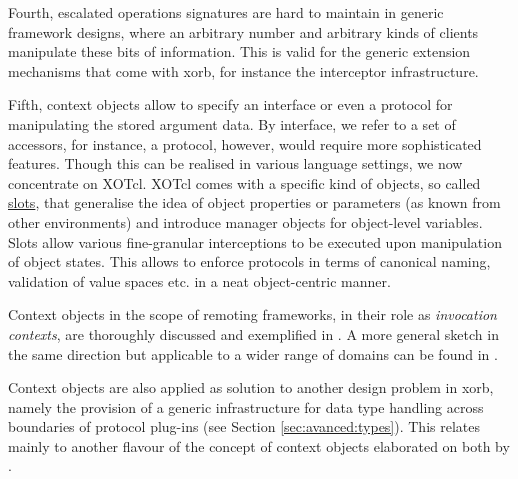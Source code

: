 Fourth, escalated operations signatures are hard to maintain in generic framework designs, where an arbitrary number and arbitrary kinds of clients manipulate these bits of information. This is valid for the generic extension mechanisms that come with xorb, for instance the interceptor infrastructure.

Fifth, context objects allow to specify an interface or even a protocol for manipulating the stored argument data. By interface, we refer to a set of accessors, for instance, a protocol, however, would require more sophisticated features. Though this can be realised in various language settings, we now concentrate on XOTcl. XOTcl comes with a specific kind of objects, so called \href{http://media.wu-wien.ac.at/doc/tutorial.html#slots}{slots}, that generalise the idea of object properties or parameters (as known from other environments) and introduce manager objects for object-level variables. Slots allow various fine-granular interceptions to be executed upon manipulation of object states. This allows to enforce protocols in terms of canonical naming, validation of value spaces etc. in a neat object-centric manner.

Context objects in the scope of remoting frameworks, in their role as \emph{invocation contexts}, are thoroughly discussed and exemplified in \cite{zdun:2005}. A more general sketch in the same direction but applicable to a wider range of domains can be found in \cite{kelly:2003}.

Context objects are also applied as solution to another design problem in xorb, namely the provision of a generic infrastructure for data type handling across boundaries of protocol plug-ins (see Section \ref{sec:avanced:types}). This relates mainly to another flavour of the concept of context objects elaborated on both by \cite{maetzel:1996,sommerlad:1998}. 
  
